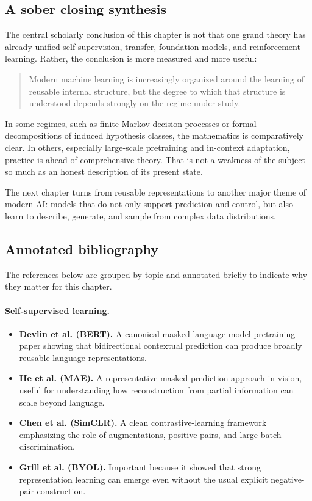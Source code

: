 \subsection*{A sober closing synthesis}

The central scholarly conclusion of this chapter is not that one grand theory has already unified self-supervision, transfer, foundation models, and reinforcement learning. Rather, the conclusion is more measured and more useful:

\begin{quote}
Modern machine learning is increasingly organized around the learning of reusable internal structure, but the degree to which that structure is understood depends strongly on the regime under study.
\end{quote}

In some regimes, such as finite Markov decision processes or formal decompositions of induced hypothesis classes, the mathematics is comparatively clear. In others, especially large-scale pretraining and in-context adaptation, practice is ahead of comprehensive theory. That is not a weakness of the subject so much as an honest description of its present state.

\medskip

The next chapter turns from reusable representations to another major theme of modern AI: models that do not only support prediction and control, but also learn to describe, generate, and sample from complex data distributions.

\subsection*{Annotated bibliography}

The references below are grouped by topic and annotated briefly to indicate why they matter for this chapter.

\paragraph{Self-supervised learning.}
\begin{itemize}
    \item \textbf{Devlin et al. (BERT).} A canonical masked-language-model pretraining paper showing that bidirectional contextual prediction can produce broadly reusable language representations.
    \item \textbf{He et al. (MAE).} A representative masked-prediction approach in vision, useful for understanding how reconstruction from partial information can scale beyond language.
    \item \textbf{Chen et al. (SimCLR).} A clean contrastive-learning framework emphasizing the role of augmentations, positive pairs, and large-batch discrimination.
    \item \textbf{Grill et al. (BYOL).} Important because it showed that strong representation learning can emerge even without the usual explicit negative-pair construction.
\end{itemize}

